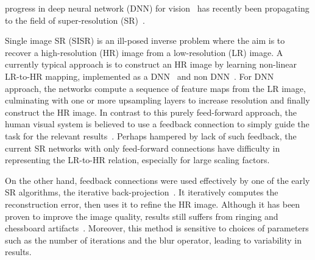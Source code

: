 \documentclass[10pt,journal,compsoc]{IEEEtran}
\begin{document}
\maketitle


\IEEEdisplaynontitleabstractindextext




\IEEEpeerreviewmaketitle


 progress in deep neural network (DNN) for
vision~\cite{huang2017densely,he2015deep,denton2015deep,shrivastava2016learning,larsson2016fractalnet,radford2015unsupervised,IMKDB17}
has recently been propagating to the field of super-resolution (SR)~\cite{johnson2016perceptual,tao2017detail,sajjadi2018frame,Haris17,Kim_2016_VDSR,LapSRN,Tai-DRRN-2017,zhang2018image,park2018srfeat}. 

Single image SR (SISR) is an ill-posed inverse problem where the aim is to
recover a high-resolution (HR) image from a low-resolution (LR)
image. A currently typical approach is to construct an HR image by
learning non-linear LR-to-HR mapping, implemented as a DNN~\cite{dong2016image, dong2016accelerating, shi2016real, LapSRN, Kim_2016_VDSR, kim2016deeply, Tai-DRRN-2017} and non DNN~\cite{schulter2015fast,haris2017first,timofte2014a+,Haris17Sparse}. 
For DNN approach, the networks compute a sequence of feature maps from the LR image, culminating with
one or more upsampling layers to increase resolution and finally
construct the HR image. In contrast to this purely feed-forward
approach, the human visual system is believed to use a feedback connection
to simply guide the task for the relevant
results~\cite{felleman1991distributed, kravitz2013ventral,
  lamme2000distinct}. Perhaps hampered by lack of such feedback,
the current SR networks with only feed-forward connections have difficulty in representing the LR-to-HR relation, especially for large scaling factors.

On the other hand, feedback connections were used effectively by one
of the early SR algorithms, the iterative
back-projection~\cite{irani93}. It iteratively computes the
reconstruction error, then uses it to refine the HR image. 
Although it has been proven to improve the image quality,
results still suffers from ringing and chessboard
artifacts~\cite{dai2007bilateral}. Moreover, this method is sensitive to
choices of parameters such as the number of iterations and the blur
operator, leading to variability in results.
\end{document}
